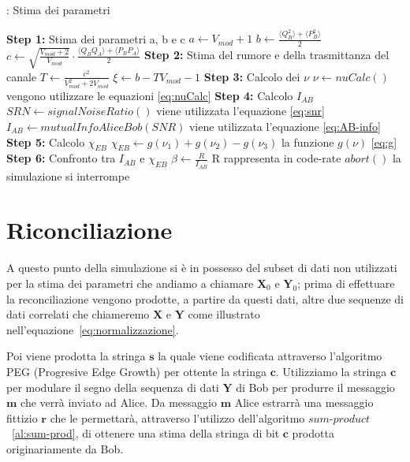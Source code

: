 \begin{algorithm}[H]
\caption{: Stima dei parametri}\label{al:stima-param}
\begin{algorithmic}[1]
\State \textbf{Step 1:} Stima dei parametri a, b e c \newline
	$a \leftarrow V_{mod} + 1$ \newline
	$b \leftarrow \frac{\langle Q_B^2 \rangle + \langle P_B^2\rangle}{2} $ \newline
	$c \leftarrow \sqrt{\frac{V_{mod} + 2}{V_{mod}}} \cdot \frac{\langle Q_BQ_A \rangle + \langle P_BP_A\rangle}{2}$ 
\State \textbf{Step 2:} Stima del rumore e della trasmittanza del canale \newline
	$T \leftarrow \frac{c^2}{V_{mod}^2 + 2 V_{mod}}$ \newline
	$\xi \leftarrow b - TV_{mod} -1 $ 
\State \textbf{Step 3:} Calcolo dei $\nu$ \newline
	$\textbf{$\nu$} \leftarrow nuCalc()$  		 \Comment vengono utilizzare le equazioni \ref{eq:nuCalc}
\State \textbf{Step 4:} Calcolo $I_{AB}$ \newline
	$SRN \leftarrow signalNoiseRatio()$	\Comment viene utilizzata l'equazione \ref{eq:snr}	
	$I_{AB} \leftarrow mutualInfoAliceBob(SNR)$	\Comment viene utilizzata l'equazione \ref{eq:AB-info}
\State \textbf{Step 5:} Calcolo $\chi_{EB}$ \newline
	$\chi_{EB} \leftarrow g(\nu_1) + g(\nu_2) - g(\nu_3)$	\Comment la funzione $g(\nu)$ \ref{eq:g}						
\State \textbf{Step 6:} Confronto tra $I_{AB}$ e $\chi_{EB}$  \newline
	$\beta \leftarrow \frac{R}{I_{AB}}$	\Comment R rappresenta in code-rate
		\State	$abort()$		\Comment la simulazione si interrompe
	\EndIf
\end{algorithmic}
\end{algorithm}


\section{Riconciliazione}
A questo punto della simulazione si \`e in possesso del subset di dati non utilizzati per la stima dei parametri che andiamo a chiamare $\textbf{X}_0$ e $\textbf{Y}_0$; prima di effettuare la reconciliazione vengono prodotte, a partire da questi dati, altre due sequenze di dati correlati che chiameremo $\textbf{X}$ e $\textbf{Y}$ come illustrato nell'equazione~\ref{eq:normalizzazione}. 

Poi viene prodotta la stringa $\textbf{s}$ la quale viene codificata attraverso l'algoritmo PEG (Progresive Edge Growth) per ottente la stringa $\textbf{c}$. Utilizziamo la stringa $\textbf{c}$ per modulare il segno della sequenza di dati $\textbf{Y}$ di Bob per produrre il messaggio  $\textbf{m}$ che verr\`a inviato ad Alice. Da messaggio  $\textbf{m}$ Alice estrarr\`a una messaggio fittizio  $\textbf{r}$ che le permettar\`a, attraverso l'utilizzo dell'algoritmo $\textit{sum-product}$~\ref{al:sum-prod}, di ottenere una stima della stringa di bit  $\textbf{c}$ prodotta originariamente da Bob.

